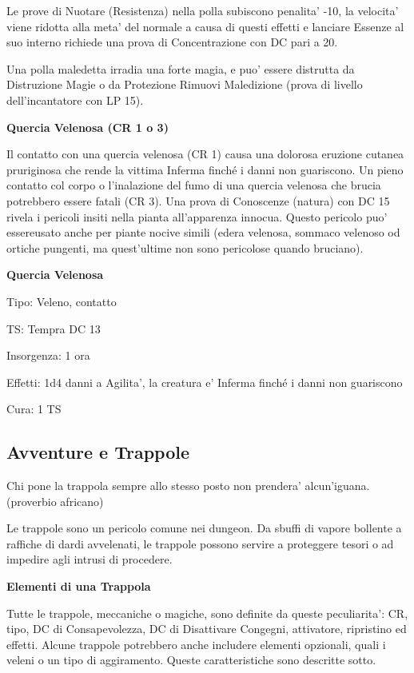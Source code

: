\documentclass[a4paper,11pt,twoside,openany]{dndbook}
\begin{document}
Le prove di Nuotare (Resistenza) nella polla subiscono penalita' -10, la velocita' viene ridotta alla meta' del normale a causa di questi effetti e lanciare Essenze al suo interno richiede una prova di Concentrazione con DC pari a 20.

Una polla maledetta irradia una forte magia, e puo' essere distrutta da Distruzione Magie o da Protezione Rimuovi Maledizione (prova di livello dell'incantatore
con LP 15).

\textbf{Quercia Velenosa (CR 1 o 3)}

Il contatto con una quercia velenosa (CR 1) causa una dolorosa eruzione cutanea pruriginosa che rende la vittima Inferma finché i danni non guariscono. Un pieno contatto col corpo o l'inalazione del fumo di una quercia velenosa che brucia potrebbero essere fatali (CR 3). Una prova di Conoscenze (natura) con DC 15 rivela i pericoli insiti nella pianta all'apparenza innocua. Questo pericolo puo' essereusato anche per piante nocive simili (edera velenosa, sommaco velenoso od ortiche pungenti, ma quest'ultime non sono pericolose quando bruciano).

\textbf{Quercia Velenosa}

Tipo: Veleno, contatto

TS: Tempra DC 13

Insorgenza: 1 ora

Effetti: 1d4 danni a Agilita', la creatura e' Inferma finché i danni
non guariscono

Cura: 1 TS

\pagebreak

\subsection{Avventure e Trappole}

\label{avventure-e-trappole}
\begin{quotebox}
Chi pone la trappola sempre allo stesso posto non prendera' alcun'iguana. (proverbio africano)
\end{quotebox}

Le trappole sono un pericolo comune nei dungeon. Da sbuffi di vapore bollente a raffiche di dardi avvelenati, le trappole possono servire a proteggere tesori o ad impedire agli intrusi di procedere. 

\textbf{Elementi di una Trappola}

Tutte le trappole, meccaniche o magiche, sono definite da queste peculiarita': CR, tipo, DC di Consapevolezza, DC di Disattivare Congegni, attivatore, ripristino ed effetti. Alcune trappole potrebbero anche includere elementi opzionali, quali i veleni o un tipo di aggiramento. Queste caratteristiche sono descritte sotto.
\end{document}

